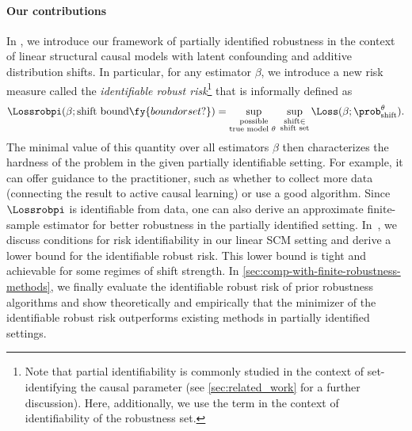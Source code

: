 
\paragraph{Our contributions}
In , we introduce our framework of partially identified robustness in the context of linear structural causal models with latent confounding and additive distribution shifts. In particular, for any estimator $\beta$, we introduce a new risk measure called the \emph{identifiable robust risk}\footnote{Note that partial identifiability is commonly studied in the context of set-identifying the causal parameter \citep{tamer2010partial} (see \cref{sec:related_work} for a further discussion). Here, additionally, we use the term in the context of identifiability of the robustness set.} that is informally defined as
\begin{align*}
    \Lossrobpi(\beta; \text{shift bound} \fy{bound or set?}) = \sup_{\substack{\text{possible}\\ \text{true model $\theta$ }}} \sup_{\substack{\text{shift} \in \\ \text{shift set}} }\Loss (\beta; \prob^{\theta}_{\text{shift}} ).
\end{align*}
The minimal value of this quantity over all estimators $\beta$ then characterizes the hardness of the problem in the given partially identifiable setting. For example, it can offer guidance to the practitioner, such as whether to collect more data (connecting the result to active causal learning) or use a good algorithm. Since $\Lossrobpi$ is identifiable from data, one can also derive an approximate finite-sample estimator for better robustness in the partially identified setting.
In~,  we discuss conditions for risk identifiability in our linear SCM setting and derive a lower bound 
for the identifiable robust risk. This lower bound is tight and achievable for some regimes of shift strength. 
In \cref{sec:comp-with-finite-robustness-methods},
we finally
evaluate the identifiable robust risk of prior robustness algorithms and show theoretically and empirically that the minimizer of the identifiable robust risk outperforms existing methods in partially identified settings.

